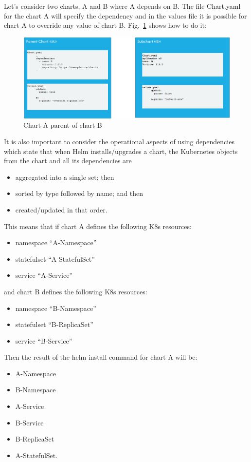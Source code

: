\documentclass[a4paper]{spie}  %
\begin{document}
Let’s consider two charts, A and B where A depends on B. The file Chart.yaml for the chart A will specify the dependency and in the values file it is possible for chart A to override any value of chart B. Fig.~\ref{fig:a_parent_b} shows how to do it:

\begin{figure}[!htb]
   \centering
   \includegraphics*[width=0.8\columnwidth]{A_parent_B}
   \caption{Chart A parent of chart B}
   \label{fig:a_parent_b}
\end{figure}

It is also important to consider the operational aspects of using dependencies which state that when Helm installs/upgrades a chart, the Kubernetes objects from the chart and all its dependencies are
\begin{itemize}
    \item aggregated into a single set; then
    \item sorted by type followed by name; and then
    \item created/updated in that order.
\end{itemize}
This means that if chart A defines the following K8s resources:
\begin{itemize}
    \item namespace “A-Namespace”
    \item statefulset “A-StatefulSet”
    \item service “A-Service”
\end{itemize}
and chart B defines the following K8s resources:
\begin{itemize}
    \item namespace “B-Namespace”
    \item statefulset “B-ReplicaSet”
    \item service “B-Service”
\end{itemize}
Then the result of the helm install command for chart A will be:
\begin{itemize}
    \item A-Namespace
    \item B-Namespace
    \item A-Service
    \item B-Service
    \item B-ReplicaSet
    \item A-StatefulSet.
\end{itemize}
\end{document}
